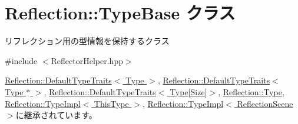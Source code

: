 \hypertarget{class_reflection_1_1_type_base}{}\section{Reflection\+:\+:Type\+Base クラス}
\label{class_reflection_1_1_type_base}


リフレクション用の型情報を保持するクラス 




{\ttfamily \#include $<$Reflector\+Helper.\+hpp$>$}



\hyperlink{class_reflection_1_1_default_type_traits}{Reflection\+::\+Default\+Type\+Traits$<$ Type $>$}, \hyperlink{class_reflection_1_1_default_type_traits_3_01_type_01_5_01_4}{Reflection\+::\+Default\+Type\+Traits$<$ Type $\ast$ $>$}, \hyperlink{class_reflection_1_1_default_type_traits_3_01_type[_size]_4}{Reflection\+::\+Default\+Type\+Traits$<$ Type\mbox{[}\+Size\mbox{]}$>$}, \hyperlink{class_reflection_1_1_type}{Reflection\+::\+Type}, \hyperlink{class_reflection_1_1_type_impl}{Reflection\+::\+Type\+Impl$<$ This\+Type $>$}, \hyperlink{class_reflection_1_1_type_impl}{Reflection\+::\+Type\+Impl$<$ Reflection\+Scene $>$}に継承されています。

